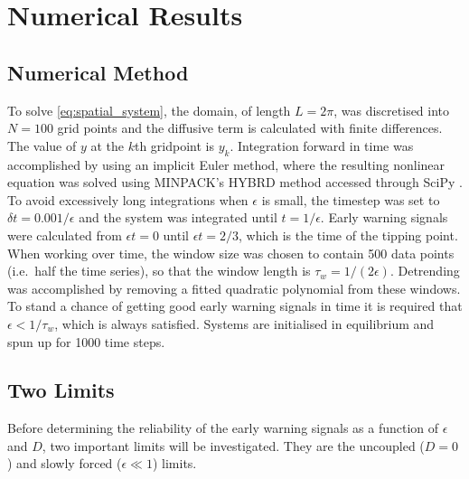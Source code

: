 \section{Numerical Results}
\subsection{Numerical Method}
To solve \cref{eq:spatial_system}, the domain, of length $L = 2\pi$, was discretised into $N = 100$ grid
points and 
the diffusive term is calculated with finite differences. The value of $y$ at the $k$th gridpoint is $y_k$. Integration forward in time was accomplished by 
using an implicit Euler method, where the resulting nonlinear equation was solved using 
MINPACK's HYBRD method accessed through SciPy \parencite{Virtanen2020}. To avoid excessively long integrations when $\epsilon$ is small,
the timestep was set to $\delta t = 0.001/\epsilon$ and the system was integrated until $t=1/\epsilon$. Early warning signals were calculated
from $\epsilon t=0$ until $\epsilon t=2/3$, which is the 
time of the tipping point. When working over time, the window size was chosen to 
contain 500 data points (i.e.\ half the time series),
so that the window length is $\tau_w = 1/(2\epsilon)$. Detrending was accomplished by removing a fitted quadratic polynomial from these windows.
To stand a chance of getting good early warning
signals in time it is required that $\epsilon < 1/\tau_w$, which is always satisfied.
Systems are initialised in equilibrium and spun up for 1000 time steps.

\subsection{Two Limits}
Before determining the reliability of the early warning signals as a function of $\epsilon$ and $D$, two important limits will be investigated. They are the uncoupled ($D = 0$)
and slowly forced ($\epsilon \ll 1$) limits.

